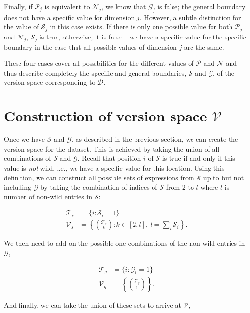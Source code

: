 Finally, if $\mathcal{P}_j$ is equivalent to $\mathcal{N}_j$, we know that $\mathcal{G}_j$ is false; the general boundary does not have a specific value for dimension $j$.  However, a subtle distinction for the value of $\mathcal{S}_j$ in this case exists.  If there is only one possible value for both $\mathcal{P}_j$ and $\mathcal{N}_j$, $\mathcal{S}_j$ is true, otherwise, it is false -- we have a specific value for the specific boundary in the case that all possible values of dimension $j$ are the same.

These four cases cover all possibilities for the different values of $\mathcal{P}$ and $\mathcal{N}$ and thus describe completely the specific and general boundaries, $\mathcal{S}$ and $\mathcal{G}$, of the version space corresponding to $\mathcal{D}$.

\section{Construction of version space $\mathcal{V}$}

Once we have $\mathcal{S}$ and $\mathcal{G}$, as described in the previous section, we can create the version space for the dataset.  This is achieved by taking the union of all combinations of $\mathcal{S}$ and $\mathcal{G}$.  Recall that position $i$ of $\mathcal{S}$ is true if and only if this value is \emph{not} wild, i.e., we have a specific value for this location.  Using this definition, we can construct all possible sets of expressions from $\mathcal{S}$ up to but not including $\mathcal{G}$ by taking the combination of indices of $\mathcal{S}$ from 2 to $l$ where $l$ is number of non-wild entries in $\mathcal{S}$:

\begin{align*}
  \mathcal{T}_s &= \{i : \mathcal{S}_i = 1\} \\
  \mathcal{V}_s &= \left\{ \binom{\mathcal{T}_s}{k} : k \in [2,l],\ l = \sum_i \mathcal{S}_i  \right\}.
\end{align*}

We then need to add on the possible one-combinations of the non-wild entries in $\mathcal{G}$,

\begin{align*}
  \mathcal{T}_g &= \{i : \mathcal{G}_i = 1\} \\
  \mathcal{V}_g &= \left\{ \binom{\mathcal{T}_g}{1} \right\}.
\end{align*}

And finally, we can take the union of these sets to arrive at $\mathcal{V}$,

